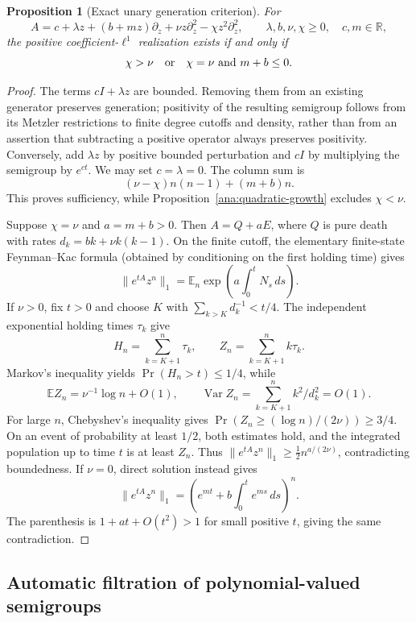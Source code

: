 \documentclass[reqno]{amsart}
\newtheorem{proposition}[theorem]{Proposition}
\theoremstyle{definition}
\theoremstyle{remark}
\newcommand{\R}{\mathbb R}
\begin{document}
\begin{proposition}[Exact unary generation criterion]\label{ana:unary-l1}
For
\[
 A=c+\lambda z+(b+mz)\partial_z+
             \nu z\partial_z^2-\chi z^2\partial_z^2,
 \qquad \lambda,b,\nu,\chi\ge0,\quad c,m\in\R,
\]
the positive coefficient-\(\ell^1\) realization exists if and only if
\[
 \chi>\nu
 \quad\hbox{or}\quad
 \chi=\nu\ \hbox{and}\ m+b\le0 .
\]
\end{proposition}
\begin{proof}
The terms \(cI+\lambda z\) are bounded.  Removing them from an existing
generator preserves generation; positivity of the resulting semigroup
follows from its Metzler restrictions to finite degree cutoffs and
density, rather than from an assertion that subtracting a positive
operator always preserves positivity.  Conversely, add \(\lambda z\)
by positive bounded perturbation and \(cI\) by multiplying the semigroup
by \(e^{ct}\).  We may set \(c=\lambda=0\).
The column sum is
\[
 (\nu-\chi)n(n-1)+(m+b)n.
\]
This proves sufficiency, while Proposition~\ref{ana:quadratic-growth}
excludes \(\chi<\nu\).

Suppose \(\chi=\nu\) and \(a=m+b>0\).  Then \(A=Q+aE\), where \(Q\)
is pure death with rates \(d_k=bk+\nu k(k-1)\).
On the finite cutoff, the elementary finite-state Feynman--Kac formula
(obtained by conditioning on the first holding time) gives
\[
 \|e^{tA}z^n\|_1
 =\mathbb E_n\exp\left(a\int_0^t N_s\,ds\right).
\]
If \(\nu>0\), fix \(t>0\) and choose \(K\) with
\(\sum_{k>K}d_k^{-1}<t/4\).
The independent exponential holding times \(\tau_k\) give
\[
 H_n=\sum_{k=K+1}^n\tau_k,\qquad
 Z_n=\sum_{k=K+1}^n k\tau_k.
\]
Markov's inequality yields \(\Pr(H_n>t)\le1/4\), while
\[
 \mathbb EZ_n=\nu^{-1}\log n+O(1),\qquad
 \operatorname{Var}Z_n=\sum_{k=K+1}^n k^2/d_k^2=O(1).
\]
For large \(n\), Chebyshev's inequality gives
\(\Pr(Z_n\ge(\log n)/(2\nu))\ge3/4\).
On an event of probability at least \(1/2\), both estimates hold, and
the integrated population up to time \(t\) is at least \(Z_n\).
Thus \(\|e^{tA}z^n\|_1\ge\tfrac12 n^{a/(2\nu)}\), contradicting boundedness.
If \(\nu=0\), direct solution instead gives
\[
 \|e^{tA}z^n\|_1
 =\left(e^{mt}+b\int_0^t e^{ms}\,ds\right)^n .
\]
The parenthesis is \(1+at+O(t^2)>1\) for small positive \(t\), giving
the same contradiction.
\end{proof}

\subsection{Automatic filtration of polynomial-valued semigroups}
\end{document}
